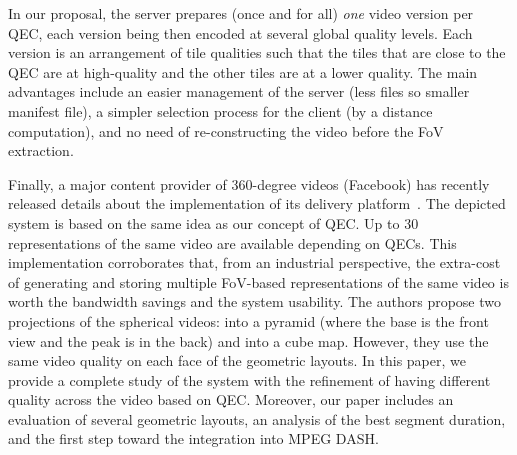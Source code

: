 In our proposal, the server prepares (once and for all) \emph{one} video version per
\ac{QEC}, each version being then encoded at several global quality levels.  Each version
is an arrangement of tile
qualities such that the tiles that are close to the \ac{QEC} are at high-quality
and the other tiles
are at a lower quality. The main advantages include an easier management of the server
(less files so smaller manifest file), a simpler selection process for the client (by
a distance computation), and no need of re-constructing the video before the \ac{FoV} extraction.

Finally, a major content provider of 360-degree videos (Facebook) has recently
released details about the
implementation of its delivery platform~\cite{facebook}. The depicted system is based
on the same idea as our concept of \ac{QEC}. Up to 30 representations of the same video 
are available depending on
\acp{QEC}. This implementation corroborates that, from an industrial perspective, the
extra-cost of
generating and storing multiple \ac{FoV}-based representations of the same video 
is worth the bandwidth
savings and the system usability. The authors propose two projections of the spherical videos:
into a pyramid (where the
base is the front
view and the peak is in the back) and into a cube map. However, they use the same video quality 
on each face of the geometric layouts. In this paper, we provide a complete study of 
the system with the refinement of having different quality across the video based on \ac{QEC}. 
Moreover, our 
paper includes an evaluation of several geometric layouts, an analysis of the best segment
duration, and the first step toward the integration into MPEG \ac{DASH}.